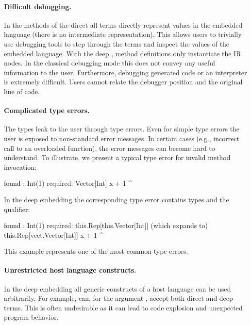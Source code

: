 
\paragraph{Difficult debugging.} In the methods of the direct \edsl{} all terms
directly represent values in the embedded language (there is no intermediate
representation). This allows users to trivially use debugging tools to step
through the terms and inspect the values of the embedded language. With the deep
\edsl{}, method definitions only instantiate the IR nodes. In the classical
debugging mode this does not convey any useful information to the user.
Furthermore, debugging generated code or an interpreter is extremely difficult.
Users cannot relate the debugger position and the original line of code.

\paragraph{Complicated type errors.} The  types leak to the user through type errors. Even for simple type errors the user is exposed to non-standard error messages. In certain cases (e.g., incorrect call to an overloaded function), the error messages can become hard to understand. To illustrate, we present a typical type error for invalid method invocation:
\begin{lstparagraph}
  found   : Int(1)
  required: Vector[Int]
       x + 1
           ^
\end{lstparagraph}
In the deep embedding the corresponding type error contains  types and the  qualifier:
\begin{lstparagraph}
  found   : Int(1)
  required: this.Rep[this.Vector[Int]]
       (which expands to) this.Rep[vect.Vector[Int]]
       x + 1
           ^
\end{lstparagraph}
This example represents one of the  most common type errors.


\paragraph{Unrestricted host language constructs.} In the deep embedding all
generic constructs of a host language can be used arbitrarily. For example,
 can, for the argument , accept
both direct and deep terms. This is often undesirable as it can lead
 to code explosion and unexpected program behavior.


